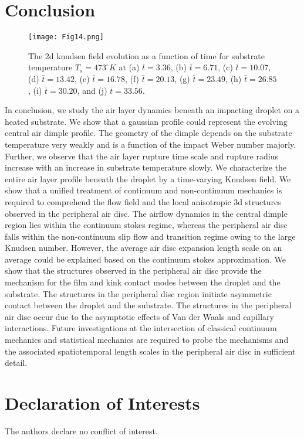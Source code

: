 \documentclass{jfm}
\begin{document}
\section{Conclusion}
\begin{figure*}
    \centering
    \texttt{[image: Fig14.png]}
    \caption{
    The 2d knudsen field evolution as a function of time for substrate temperature ${T}_s=473^{\circ}K$ at (a) $\bar{t}=3.36$, (b) $\bar{t}=6.71$, (c) $\bar{t}=10.07$, (d) $\bar{t}=13.42$, (e) $\bar{t}=16.78$, (f) $\bar{t}=20.13$, (g) $\bar{t}=23.49$, (h) $\bar{t}=26.85$, (i) $\bar{t}=30.20$, and (j) $\bar{t}=33.56$.
    }
    \label{Figure14}
\end{figure*}
In conclusion, we study the air layer dynamics beneath an impacting droplet on a heated substrate. We show that a gaussian profile could represent the evolving central air dimple profile. The geometry of the dimple depends on the substrate temperature very weakly and is a function of the impact Weber number majorly. Further, we observe that the air layer rupture time scale and rupture radius increase with an increase in substrate temperature slowly. We characterize the entire air layer profile beneath the droplet by a time-varying Knudsen field. We show that a unified treatment of continuum and non-continuum mechanics is required to comprehend the flow field and the local anisotropic 3d structures observed in the peripheral air disc. The airflow dynamics in the central dimple region lies within the continuum stokes regime, whereas the peripheral air disc falls within the non-continuum slip flow and transition regime owing to the large Knudsen number. However, the average air disc expansion length scale on an average could be explained based on the continuum stokes approximation. We show that the structures observed in the peripheral air disc provide the mechanism for the film and kink contact modes between the droplet and the substrate. The structures in the peripheral disc region initiate asymmetric contact between the droplet and the substrate. The structures in the peripheral air disc occur due to the asymptotic effects of Van der Waals and capillary interactions. Future investigations at the intersection of classical continuum mechanics and statistical mechanics are required to probe the mechanisms and the associated spatiotemporal length scales in the peripheral air disc in sufficient detail.   






\section*{Declaration of Interests}
The authors declare no conflict of interest.
\clearpage


\end{document}
